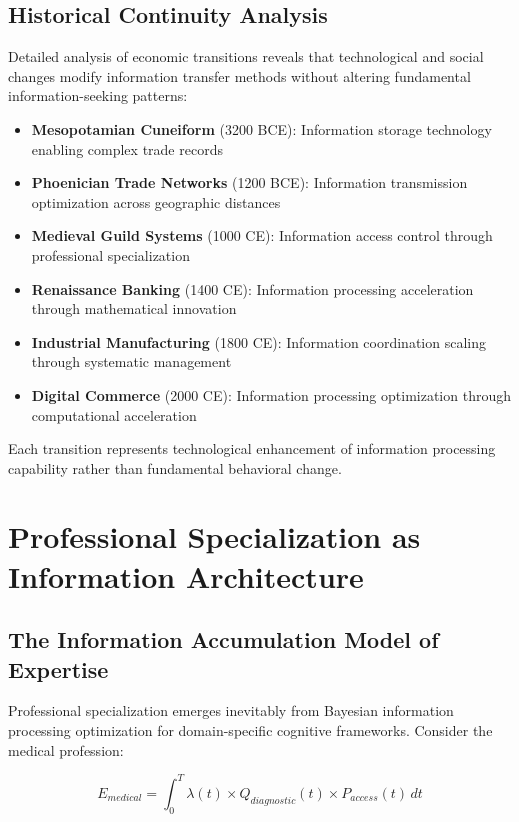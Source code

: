 \documentclass[12pt,a4paper]{article}
\begin{document}
\subsection{Historical Continuity Analysis}

Detailed analysis of economic transitions reveals that technological and social changes modify information transfer methods without altering fundamental information-seeking patterns:

\begin{itemize}
\item \textbf{Mesopotamian Cuneiform} (3200 BCE): Information storage technology enabling complex trade records
\item \textbf{Phoenician Trade Networks} (1200 BCE): Information transmission optimization across geographic distances
\item \textbf{Medieval Guild Systems} (1000 CE): Information access control through professional specialization
\item \textbf{Renaissance Banking} (1400 CE): Information processing acceleration through mathematical innovation
\item \textbf{Industrial Manufacturing} (1800 CE): Information coordination scaling through systematic management
\item \textbf{Digital Commerce} (2000 CE): Information processing optimization through computational acceleration
\end{itemize}

Each transition represents technological enhancement of information processing capability rather than fundamental behavioral change.

\section{Professional Specialization as Information Architecture}

\subsection{The Information Accumulation Model of Expertise}

Professional specialization emerges inevitably from Bayesian information processing optimization for domain-specific cognitive frameworks. Consider the medical profession:

\begin{equation}
E_{medical} = \int_{0}^{T} \lambda(t) \times Q_{diagnostic}(t) \times P_{access}(t) \, dt
\end{equation}
\end{document}
